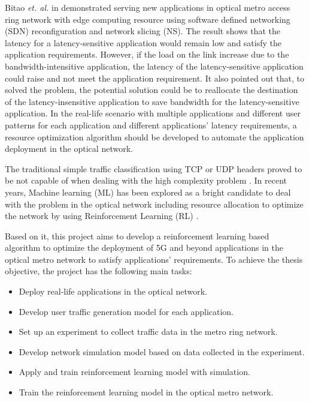 \documentclass[conference]{IEEEtran}
\begin{document}
Bitao \textit{et. al.} in \cite{8818041} demonstrated serving new applications in optical metro access ring network with edge computing resource using software defined networking (SDN) reconfiguration and network slicing (NS). The result shows that the latency for a latency-sensitive application would remain low and satisfy the application requirements. However, if the load on the link increase due to the bandwidth-intensitive application, the latency of the latency-sensitive application could raise and not meet the application requirement. It also pointed out that, to solved the problem, the potential solution could be to reallocate the destination of the latency-insensitive application to save bandwidth for the latency-sensitive application. In the real-life scenario with multiple applications and different user patterns for each application and different applications' latency requirements, a resource optimization algorithm should be developed to automate the application deployment in the optical network. 

The traditional simple traffic classification using TCP or UDP headers proved to be not capable of when dealing with the high complexity problem \cite{4738466}. In recent years,  Machine learning (ML) has been explored as a bright candidate to deal with the problem in the optical network including resource allocation to optimize the network by using Reinforcement Learning (RL) \cite{Gu2020}. 

Based on it, this project aims to develop a reinforcement learning based algorithm to optimize the deployment of 5G and beyond applications in the optical metro network to satisfy applications’ requirements.
To achieve the thesis objective, the project has the following main tasks:
\begin{itemize}
    \item Deploy real-life applications in the optical network.
    \item Develop user traffic generation model for each application.
    \item Set up an experiment to collect traffic data in the metro ring network.
    \item Develop network simulation model based on data collected in the experiment.
    \item Apply and train reinforcement learning model with simulation.
    \item Train the reinforcement learning model in the optical metro network.
\end{itemize}
\end{document}
